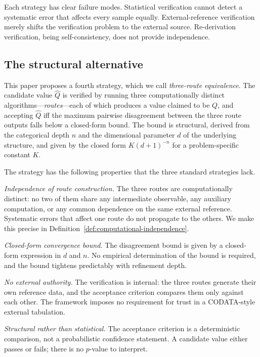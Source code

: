 \documentclass[twocolumn,11pt,a4paper]{article}
\newcommand{\Inv}{Q}
\newcommand{\Depth}{n}
\newcommand{\Dim}{d}
\newcommand{\Tolb}{K}
\begin{document}
Each strategy has clear failure modes. Statistical verification cannot detect a systematic error that affects every sample equally. External-reference verification merely shifts the verification problem to the external source. Re-derivation verification, being self-consistency, does not provide independence.

\subsection{The structural alternative}

This paper proposes a fourth strategy, which we call \emph{three-route equivalence}. The candidate value $\hat\Inv$ is verified by running three computationally distinct algorithms---\emph{routes}---each of which produces a value claimed to be $\Inv$, and accepting $\hat\Inv$ iff the maximum pairwise disagreement between the three route outputs falls below a closed-form bound. The bound is structural, derived from the categorical depth $\Depth$ and the dimensional parameter $\Dim$ of the underlying structure, and given by the closed form $\Tolb(\Dim+1)^{-\Depth}$ for a problem-specific constant $\Tolb$.

The strategy has the following properties that the three standard strategies lack.

\emph{Independence of route construction.} The three routes are computationally distinct: no two of them share any intermediate observable, any auxiliary computation, or any common dependence on the same external reference. Systematic errors that affect one route do not propagate to the others. We make this precise in Definition~\ref{def:computational-independence}.

\emph{Closed-form convergence bound.} The disagreement bound is given by a closed-form expression in $\Dim$ and $\Depth$. No empirical determination of the bound is required, and the bound tightens predictably with refinement depth.

\emph{No external authority.} The verification is internal: the three routes generate their own reference data, and the acceptance criterion compares them only against each other. The framework imposes no requirement for trust in a CODATA-style external tabulation.

\emph{Structural rather than statistical.} The acceptance criterion is a deterministic comparison, not a probabilistic confidence statement. A candidate value either passes or fails; there is no $p$-value to interpret.
\end{document}
